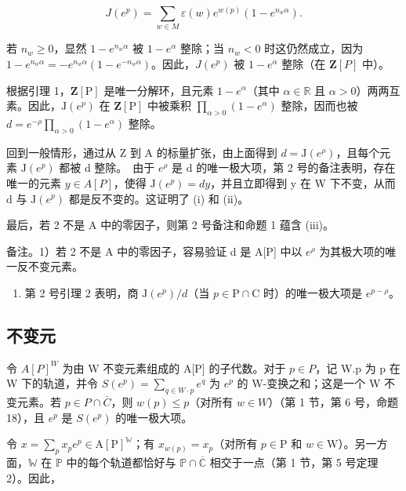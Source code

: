 \[
J (e ^ {p}) = \sum_ {w \in M} \varepsilon (w) e ^ {w (p)} \left(1 - e ^ {n _ {w} \alpha}\right).
\]

若 \(n_w \geqslant 0\)，显然 \(1 - e^{n_w\alpha}\) 被 \(1 - e^\alpha\) 整除；当 \(n_w < 0\) 时这仍然成立，因为 \(1 - e^{n_w\alpha} = -e^{n_w\alpha}(1 - e^{-n_w\alpha})\)。因此，\(J(e^p)\) 被 \(1 - e^\alpha\) 整除（在 \(\mathbf{Z}[P]\) 中）。

根据引理 1，\(\mathbf{Z}[\mathrm{P}]\) 是唯一分解环，且元素 \(1 - e^{\alpha}\)（其中 \(\alpha \in \mathbb{R}\) 且 \(\alpha > 0\)）两两互素。因此，\(\mathrm{J}(e^{p})\) 在 \(\mathbf{Z}[\mathrm{P}]\) 中被乘积 \(\prod_{\alpha > 0}(1 - e^{\alpha})\) 整除，因而也被 \(d = e^{-\rho}\prod_{\alpha > 0}(1 - e^{\alpha})\) 整除。

回到一般情形，通过从 Z 到 A 的标量扩张，由上面得到 \(d = \mathrm{J}(e^{\rho})\)，且每个元素 \(\mathrm{J}(e^{p})\) 都被 d 整除。~由于 \(e^{\rho}\) 是 d 的唯一极大项，第 2 号的备注表明，存在唯一的元素 \(y \in A[P]\)，使得 \(\mathrm{J}(e^{p}) = dy\)，并且立即得到 y 在 W 下不变，从而 d 与 \(\mathrm{J}(e^{p})\) 都是反不变的。这证明了 (i) 和 (ii)。

最后，若 2 不是 A 中的零因子，则第 2 号备注和命题 1 蕴含 (iii)。

备注。1）若 2 不是 A 中的零因子，容易验证 d 是 A{[}P{]} 中以 \(e^{\rho}\) 为其极大项的唯一反不变元素。

\begin{enumerate}
\def\labelenumi{\arabic{enumi})}
\setcounter{enumi}{1}
\tightlist
\item
  第 2 号引理 2 表明，商 \(\mathrm{J}(e^p) / d\)（当 \(p\in \mathrm{P}\cap \mathrm{C}\) 时）的唯一极大项是 \(e^{p - \rho}\)。
\end{enumerate}

\subsection{不变元}

令 \(A[P]^W\) 为由 W 不变元素组成的 A{[}P{]} 的子代数。对于 \(p \in P\)，记 W.p 为 p 在 W 下的轨道，并令 \(S(e^p) = \sum_{q \in W \cdot p} e^q\) 为 \(e^p\) 的 W-变换之和；这是一个 W 不变元素。若 \(p \in P \cap \overline{C}\)，则 \(w(p) \leqslant p\)（对所有 \(w \in W\)）（第 1 节，第 6 号，命题 18），且 \(e^p\) 是 \(S(e^p)\) 的唯一极大项。

令 \(x = \sum_{p} x_{p} e^{p} \in \mathrm{A}[\mathrm{P}]^{\mathbb{W}}\)；有 \(x_{w(p)} = x_{p}\)（对所有 \(p \in \mathrm{P}\) 和 \(w \in \mathrm{W}\)）。另一方面，\(\mathbb{W}\) 在 \(\mathbb{P}\) 中的每个轨道都恰好与 \(\mathbb{P} \cap \overline{\mathbb{C}}\) 相交于一点（第 1 节，第 5 号定理 2）。因此，


